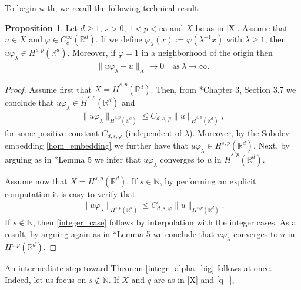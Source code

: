 \documentclass[letterpaper, 11pt,  reqno]{amsart}
\theoremstyle{definition}
\newtheorem{proposition}{Proposition}[section]
\theoremstyle{remark}
\numberwithin{equation}{section}
\newcommand{\bbr}{\mathbb{R}}
\newcommand{\N}{{\mathbb N}}
\newcommand{\R}{{\mathbb R}}
\newcommand{\eps}{{\varepsilon}}
\begin{document}
To begin with, we recall the following technical result:
\begin{proposition}\label{converging_H}
Let $d\ge 1$,  $s>0$, $1<p<\infty$ and $X$ be as in \eqref{X}. Assume that $u\in X$ and $\varphi\in C^{\infty}_c(\bbr^d)$. If we define $\varphi_\lambda(x):=\varphi(\lambda^{-1}x)$ with $\lambda\ge 1$, then $u\varphi_\lambda\in {H}^{s,p}(\bbr^d)$. Moreover, if $\varphi=1$ in a neighborhood of the origin then
\begin{align*}
\|u \varphi_\lambda-u\|_{X}\to 0\quad \text{as}\ \lambda\to \infty.
\end{align*}
\end{proposition}
\begin{proof}
Assume first that $X=\dot H^{s,p}(\R^d)$. Then, from \cite{mult_mazya}*{Chapter 3, Section 3.7} we conclude that $u\varphi_{\lambda}\in \dot H^{s,p}(\R^d)$ and
\begin{align*}
\|u\varphi_\lambda\|_{\dot H^{s,p}(\R^d)}\le C_{d,s,\varphi}\|u\|_{\dot H^{s,p}(\R^d)},
\end{align*}
for some positive constant $C_{d,s,\varphi}$ (independent of $\lambda$).
Moreover, by the Sobolev embedding \eqref{hom_embedding} we further have that $u\varphi_{\lambda}\in H^{s,p}(\R^d)$. Next, by arguing as in \cite{multiplier}*{Lemma 5} we infer that $u\varphi_{\lambda}$ converges to $u$ in $\dot H^{s,p}(\R^d)$. 

Assume now that $X=H^{s,p}(\R^d)$. If $s\in \N$, by performing an explicit computation it is easy to verify that
\begin{align}\label{integer_case}
\|u \varphi_\lambda\|_{H^{s,p}(\R^d)}\le C_{d,s,\varphi}\|u\|_{H^{s,p}(\R^d)}. 
\end{align}
If  $s\notin \N$, then \eqref{integer_case} follows by interpolation with the integer cases. As a result, by arguing again as in \cite{multiplier}*{Lemma 5} we conclude that $u\varphi_{\lambda}$ converges to $u$ in $H^{s,p}(\R^d)$.
\end{proof}
An intermediate step toward Theorem \ref{integr_alpha_big} follows at once. Indeed, let us focus on $s\notin \N$. If $X$ and $\bar{q}$ are as in \eqref{X} and \eqref{q_}, %
\end{document}
